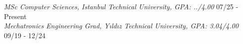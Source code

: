 \documentclass[letter,14pt]{article}
\begin{document}
\textit{MSc Computer Sciences, Istanbul Technical University, GPA: ../4.00} \hfill 07/25 - Present\\
\textit{Mechatronics Engineering Grad, Yıldız Technical University, GPA: 3.04/4.00} 	\hfill 09/19 - 12/24 \\ 
\end{document}
